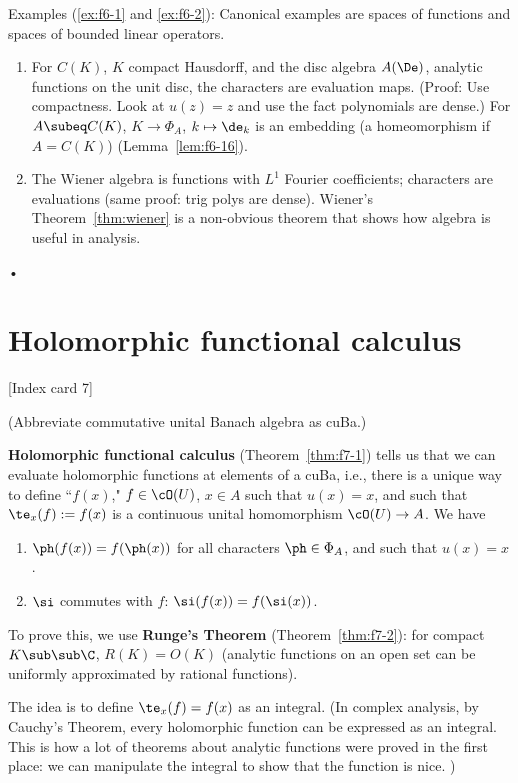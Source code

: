 Examples (\ref{ex:f6-1} and \ref{ex:f6-2}): Canonical examples are spaces of functions and spaces of bounded linear operators. 
\begin{enumerate}
\item
For $C(K)$, $K$ compact Hausdorff, and the disc algebra $A(\De)$, analytic functions on the unit disc, the characters are evaluation maps. (Proof: Use compactness. Look at $u(z)=z$ and use the fact polynomials are dense.) For $A\subeq C(K)$, $K\to \Phi_A$, $k\mapsto \de_k$ is an embedding (a homeomorphism if $A=C(K)$) (Lemma~\ref{lem:f6-16}).
\item The Wiener algebra is functions with $L^1$ Fourier coefficients; characters are evaluations (same proof: trig polys are dense). Wiener's Theorem~\ref{thm:wiener} is a non-obvious theorem that shows how algebra is useful in analysis.
\end{enumerate}•


\section{Holomorphic functional calculus}
[Index card 7]

(Abbreviate commutative unital Banach algebra as cuBa.)

\textbf{Holomorphic functional calculus} (Theorem~\ref{thm:f7-1}) tells us that we can evaluate holomorphic functions at elements of a cuBa, i.e., there is a unique way to define ``$f(x)$," $f\in \cO(U)$, $x\in A$ such that $u(x)=x$, and such that $\te_x(f):=f(x)$ is a continuous unital homomorphism $\cO(U)\to A$. We have
\begin{enumerate}
\item
$\ph(f(x))=f(\ph(x))$ for all characters $\ph\in  \Phi_A$, and such that $u(x)=x$. 
\item
$\si$ commutes with $f$: $\si(f(x))=f(\si(x))$.
\end{enumerate}
To prove this, we use \textbf{Runge's Theorem} (Theorem~\ref{thm:f7-2}): for compact $K\sub\sub \C$, $R(K)=O(K)$ (analytic functions on an open set can be uniformly approximated by rational functions).

The idea is to define $\te_x(f)=f(x)$ as an integral. (In complex analysis, by Cauchy's Theorem, every holomorphic function can be expressed as an integral. This is how a lot of theorems about analytic functions were proved in the first place: we can manipulate the integral to show that the function is nice. )

